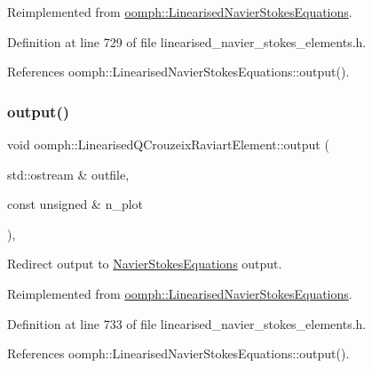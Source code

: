 Reimplemented from \hyperlink{classoomph_1_1LinearisedNavierStokesEquations_a87e366a3fe677cbbb99f4cba17d0f4c6}{oomph\+::\+Linearised\+Navier\+Stokes\+Equations}.



Definition at line 729 of file linearised\+\_\+navier\+\_\+stokes\+\_\+elements.\+h.



References oomph\+::\+Linearised\+Navier\+Stokes\+Equations\+::output().

\mbox{\label{classoomph_1_1LinearisedQCrouzeixRaviartElement_adc35ea04b68f963b4a17f206c89bae25}} 
\subsubsection{\texorpdfstring{output()}{output()}\hspace{0.1cm}{\footnotesize\ttfamily [2/4]}}
{\footnotesize\ttfamily void oomph\+::\+Linearised\+Q\+Crouzeix\+Raviart\+Element\+::output (\begin{DoxyParamCaption}\item[{std\+::ostream \&}]{outfile,  }\item[{const unsigned \&}]{n\+\_\+plot }\end{DoxyParamCaption})\hspace{0.3cm}{\ttfamily [inline]}, {\ttfamily [virtual]}}



Redirect output to \hyperlink{classoomph_1_1NavierStokesEquations}{Navier\+Stokes\+Equations} output. 



Reimplemented from \hyperlink{classoomph_1_1LinearisedNavierStokesEquations_a66bb65cc2c52846e76f8d02c1f956215}{oomph\+::\+Linearised\+Navier\+Stokes\+Equations}.



Definition at line 733 of file linearised\+\_\+navier\+\_\+stokes\+\_\+elements.\+h.



References oomph\+::\+Linearised\+Navier\+Stokes\+Equations\+::output().

\mbox{\label{classoomph_1_1LinearisedQCrouzeixRaviartElement_a3654e347b8eeb08452d67fe19d351cc8}} 
